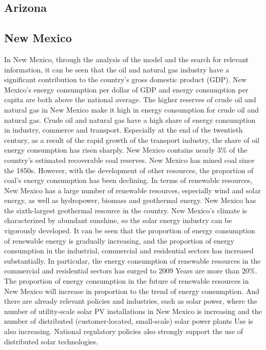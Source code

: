 \documentclass{mcmthesis}
\begin{document}
\subsection{Arizona}
\subsection{New Mexico}
In New Mexico, through the analysis of the model and the search for relevant information, it can be seen that the oil and natural gas industry have a significant contribution to the country's gross domestic product (GDP).
New Mexico's energy consumption per dollar of GDP and energy consumption per capita are both above the national average.
The higher reserves of crude oil and natural gas in New Mexico make it high in energy consumption for crude oil and natural gas.
Crude oil and natural gas have a high share of energy consumption in industry, commerce and transport.
Especially at the end of the twentieth century, as a result of the rapid growth of the transport industry, the share of oil energy consumption has risen sharply.
New Mexico contains nearly $3\%$ of the country's estimated recoverable coal reserves.
New Mexico has mined coal since the 1850s. However, with the development of other resources, the proportion of coal's energy consumption has been declining.
In terms of renewable resources, New Mexico has a large number of renewable resources, especially wind and solar energy, as well as hydropower, biomass and geothermal energy.
New Mexico has the sixth-largest geothermal resource in the country. New Mexico's climate is characterized by abundant sunshine, so the solar energy industry can be vigorously developed.
It can be seen that the proportion of energy consumption of renewable energy is gradually increasing, and the proportion of energy consumption in the industrial, commercial and residential sectors has increased substantially.
In particular, the energy consumption of renewable resources in the commercial and residential sectors has surged to 2009 Years are more than $20\%$.
The proportion of energy consumption in the future of renewable resources in New Mexico will increase in proportion to the trend of energy consumption.
And there are already relevant policies and industries, such as solar power, where the number of utility-scale solar PV installations in New Mexico is increasing and the number of distributed (customer-located, small-scale) solar power plants Use is also increasing.
National regulatory policies also strongly support the use of distributed solar technologies.
\end{document}
